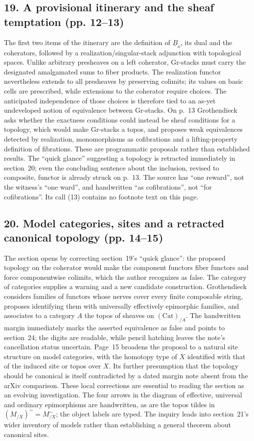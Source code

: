 \documentclass[10pt,oneside]{book}
\begin{document}
\subsection*{19. A provisional itinerary and the sheaf temptation (pp. 12--13)}
The first two items of the itinerary are the definition of $\underline B_o$, its dual and the coherators, followed by a realization/singular-stack adjunction with topological spaces. Unlike arbitrary presheaves on a left coherator, Gr-stacks must carry the designated amalgamated sums to fiber products. The realization functor nevertheless extends to all presheaves by preserving colimits; its values on basic cells are prescribed, while extensions to the coherator require choices. The anticipated independence of those choices is therefore tied to an as-yet undeveloped notion of equivalence between Gr-stacks. On p.~13 Grothendieck asks whether the exactness conditions could instead be sheaf conditions for a topology, which would make Gr-stacks a topos, and proposes weak equivalences detected by realization, monomorphisms as cofibrations and a lifting-property definition of fibrations. These are programmatic proposals rather than established results. The ``quick glance'' suggesting a topology is retracted immediately in section~20; even the concluding sentence about the inclusion, revised to composite, functor is already struck on p.~13. The source has ``one reward'', not the witness's ``one ward'', and handwritten ``as cofibrations'', not ``for cofibrations''. Its call (13) contains no footnote text on this page.

\subsection*{20. Model categories, sites and a retracted canonical topology (pp. 14--15)}
The section opens by correcting section~19's ``quick glance'': the proposed topology on the coherator would make the component functors fiber functors and force componentwise colimits, which the author recognizes as false. The category of categories supplies a warning and a new candidate construction. Grothendieck considers families of functors whose nerves cover every finite composable string, proposes identifying them with universally effectively epimorphic families, and associates to a category $A$ the topos of sheaves on $(\mathrm{Cat})_{/A}$. The handwritten margin immediately marks the asserted equivalence as false and points to section~24; the digits are readable, while pencil hatching leaves the note's cancellation status uncertain. Page~15 broadens the proposal to a natural site structure on model categories, with the homotopy type of $X$ identified with that of the induced site or topos over $X$. Its further presumption that the topology should be canonical is itself contradicted by a dated margin note absent from the arXiv comparison. These local corrections are essential to reading the section as an evolving investigation. The four arrows in the diagram of effective, universal and ordinary epimorphisms are handwritten, as are the topos tildes in $(M_{/X})^{\sim}=M^{\sim}_{/X}$; the object labels are typed. The inquiry leads into section~21's wider inventory of models rather than establishing a general theorem about canonical sites.
\end{document}
